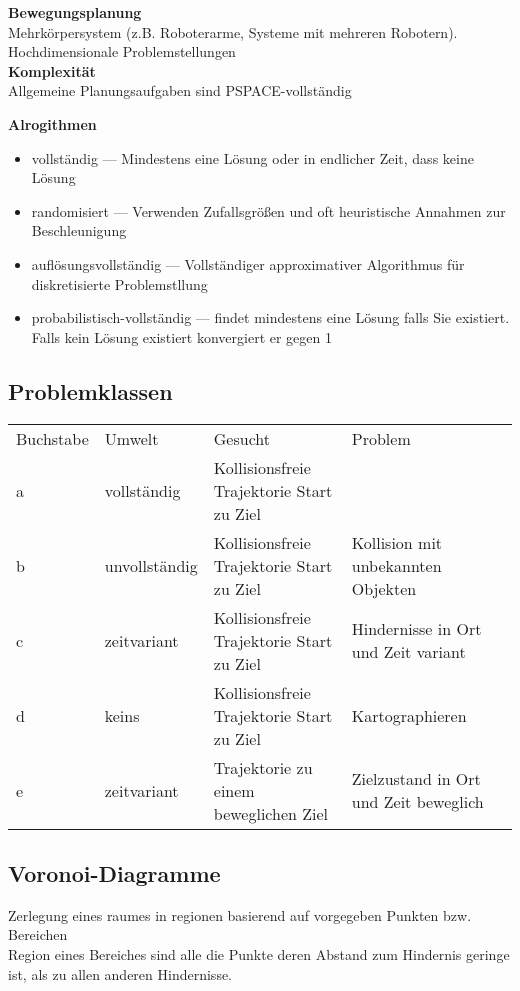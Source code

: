 \textbf{Bewegungsplanung}\\
Mehrkörpersystem (z.B. Roboterarme, Systeme mit mehreren Robotern).\\
Hochdimensionale Problemstellungen\\

\textbf{Komplexität}\\
Allgemeine Planungsaufgaben sind PSPACE-vollständig

\textbf{Alrogithmen}\\
\begin{itemize}
\item vollständig --- Mindestens eine Lösung oder in endlicher Zeit, dass keine Lösung
\item randomisiert --- Verwenden Zufallsgrößen und oft heuristische Annahmen zur Beschleunigung
\item auflösungsvollständig --- Vollständiger approximativer Algorithmus für diskretisierte Problemstllung
\item probabilistisch-vollständig --- findet mindestens eine Lösung falls Sie existiert. Falls kein Lösung existiert
  konvergiert er gegen 1
\end{itemize}

\subsection{Problemklassen}
\begin{tabular}{lllll}
  Buchstabe & Umwelt & Gesucht & Problem\\
  a & vollständig &  Kollisionsfreie Trajektorie Start zu Ziel & \\
  b & unvollständig & Kollisionsfreie Trajektorie Start zu Ziel & Kollision mit unbekannten Objekten\\
  c & zeitvariant &  Kollisionsfreie Trajektorie Start zu Ziel & Hindernisse in Ort und Zeit variant\\
  d & keins &  Kollisionsfreie Trajektorie Start zu Ziel & Kartographieren\\
  e & zeitvariant &  Trajektorie zu einem beweglichen Ziel & Zielzustand in Ort und Zeit beweglich\\
\end{tabular}

\subsection{Voronoi-Diagramme}
Zerlegung eines raumes in regionen basierend auf vorgegeben Punkten bzw. Bereichen\\
Region eines Bereiches sind alle die Punkte deren Abstand zum Hindernis geringe ist, als zu allen anderen Hindernisse.\\

